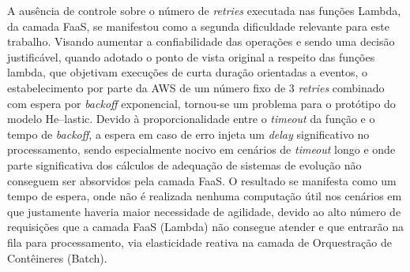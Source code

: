 \documentclass[english,brazilian]{UNISINOSmonografia} %
\begin{document}
A ausência de controle sobre o número de \textit{retries} executada nas funções Lambda, da camada FaaS, se manifestou como a segunda dificuldade relevante para este trabalho.
%
Visando aumentar a confiabilidade das operações e sendo uma decisão justificável, quando adotado o ponto de vista original a respeito das funções lambda, que objetivam execuções de curta duração orientadas a eventos, o estabelecimento por parte da AWS de um número fixo de 3 \textit{retries} combinado com espera por \textit{backoff} exponencial, tornou-se um problema para o protótipo do modelo \textsf{He}--lastic.
%
Devido à proporcionalidade entre o \textit{timeout} da função e o tempo de \textit{backoff}, a espera em caso de erro injeta um \textit{delay} significativo no processamento, sendo especialmente nocivo em cenários de \textit{timeout} longo e onde parte significativa dos cálculos de adequação de sistemas de evolução não conseguem ser absorvidos pela camada FaaS.
%
O resultado se manifesta como um tempo de espera, onde não é realizada nenhuma computação útil nos cenários em que justamente haveria maior necessidade de agilidade, devido ao alto número de requisições que a camada FaaS (Lambda) não consegue atender e que entrarão na fila para processamento, via elasticidade reativa na camada de Orquestração de Contêineres (Batch).
\end{document}
